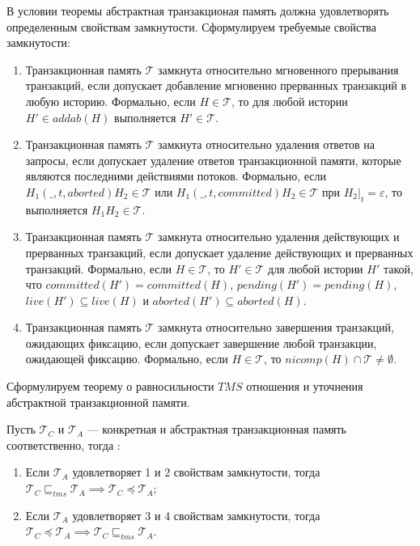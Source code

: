 В условии теоремы абстрактная транзакционая память должна удовлетворять определенным свойствам замкнутости. Сформулируем требуемые свойства замкнутости:
\begin{enumerate}
\item Транзакционная память $\mathcal{T}$ замкнута относительно мгновенного прерывания транзакций, если допускает добавление мгновенно прерванных транзакций в любую историю. Формально, если $H \in \mathcal{T}$, то для любой истории $H' \in addab(H)$ выполняется $H' \in \mathcal{T}$.  
\item Транзакционная память $\mathcal{T}$ замкнута относительно удаления ответов на запросы, если допускает удаление ответов транзакционной памяти, которые являются последними действиями потоков. Формально, если $H_1(\_, t, aborted)H_2 \in \mathcal{T}$ или $H_1(\_, t, committed)H_2 \in \mathcal{T}$ при $H_2|_t = \varepsilon$, то выполняется $H_1H_2 \in \mathcal{T}$.
\item Транзакционная память $\mathcal{T}$ замкнута относительно удаления действующих и прерванных транзакций, если допускает удаление действующих и прерванных транзакций. Формально, если $H \in \mathcal{T}$, то $H' \in \mathcal{T}$ для любой истории $H'$ такой, что $committed(H') = committed(H)$, $pending(H') = pending(H)$, $live(H') \subseteq live(H)$ и $aborted(H') \subseteq aborted(H)$. 
\item Транзакционная память $\mathcal{T}$ замкнута относительно завершения транзакций, ожидающих фиксацию, если допускает завершение любой транзакции, ожидающей фиксацию. Формально, если $H \in \mathcal{T}$, то $nicomp(H) \cap \mathcal{T} \neq \emptyset$. 
\end{enumerate}

Сформулируем теорему о равносильности $TMS$ отношения и уточнения абстрактной транзакционной памяти.

\begin{theorem}\label{theorem1} Пусть $\mathcal{T}_C$ и $\mathcal{T}_A$ --- конкретная и абстрактная транзакционная память соответственно, тогда :
\begin{enumerate}[label=(\roman*)]
\item Если $\mathcal{T}_A$ удовлетворяет 1 и 2 свойствам замкнутости, тогда $\mathcal{T}_C \sqsubseteq_{tms} \mathcal{T}_A \implies \mathcal{T}_C \preceq \mathcal{T}_A$;
\item Если $\mathcal{T}_A$ удовлетворяет 3 и 4 свойствам замкнутости, тогда $\mathcal{T}_C \preceq \mathcal{T}_A \implies \mathcal{T}_C \sqsubseteq_{tms} \mathcal{T}_A $.
\end{enumerate}
\end{theorem}

